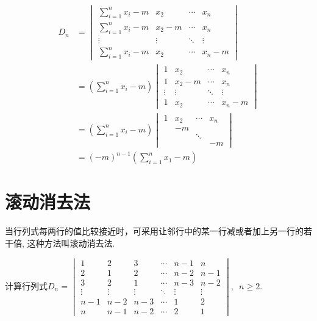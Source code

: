 \begin{solution}
    \begin{align*}
        D_n & =\begin{vmatrix}
                   \displaystyle\sum_{i=1}^{n} x_i-m & x_2    & \cdots & x_n    \\
                   \displaystyle\sum_{i=1}^{n} x_i-m & x_2-m  & \cdots & x_n    \\
                   \vdots                            & \vdots & \ddots & \vdots \\
                   \displaystyle\sum_{i=1}^{n} x_i-m & x_2    & \cdots & x_n-m
               \end{vmatrix} \\
            & =\left(\sum_{i=1}^{n} x_i-m\right)
        \begin{vmatrix}
            1      & x_2    & \cdots & x_n    \\
            1      & x_2-m  & \cdots & x_n    \\
            \vdots & \vdots & \ddots & \vdots \\
            1      & x_2    & \cdots & x_n-m
        \end{vmatrix}                                   \\
            & =\left(\sum_{i=1}^{n} x_i-m\right)
        \begin{vmatrix}
            1 & x_2 & \cdots & x_n \\
              & -m  &        &     \\
              &     & \ddots &     \\
              &     &        & -m
        \end{vmatrix}                                                \\
            & =(-m)^{n-1}\left(\sum_{i=1}^{n} x_1-m\right)
    \end{align*}
\end{solution}

\section{滚动消去法}

当行列式每两行的值比较接近时，可采用让邻行中的某一行减或者加上另一行的若干倍, 这种方法叫滚动消去法.

\begin{example}
    计算行列式$D_n=\begin{vmatrix}
            1      & 2      & 3      & \cdots & n-1    & n      \\
            2      & 1      & 2      & \cdots & n-2    & n-1    \\
            3      & 2      & 1      & \cdots & n-3    & n-2    \\
            \vdots & \vdots & \vdots & \ddots & \vdots & \vdots \\
            n-1    & n-2    & n-3    & \cdots & 1      & 2      \\
            n      & n-1    & n-2    & \cdots & 2      & 1
        \end{vmatrix},\enspace n \geqslant 2$.
\end{example}

